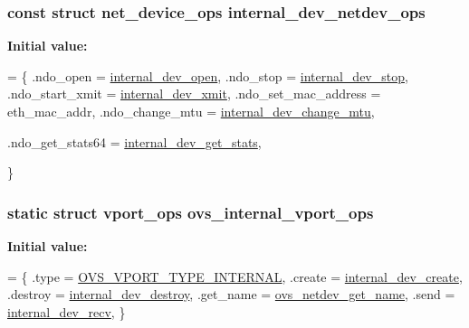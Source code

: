 \subsubsection[{internal\+\_\+dev\+\_\+netdev\+\_\+ops}]{\setlength{\rightskip}{0pt plus 5cm}const struct net\+\_\+device\+\_\+ops internal\+\_\+dev\+\_\+netdev\+\_\+ops\hspace{0.3cm}{\ttfamily [static]}}\label{vport-internal__dev_8c_af6e4b8260f029c8e987281b6e9890b8e}
{\bfseries Initial value\+:}
\begin{DoxyCode}
= \{
    .ndo\_open = \hyperlink{vport-internal__dev_8c_ad76be69f068e92dd73ee48d599a37ee3}{internal\_dev\_open},
    .ndo\_stop = \hyperlink{vport-internal__dev_8c_ac0b3dbdb4d6a02faeb1b94c46fe1ceb7}{internal\_dev\_stop},
    .ndo\_start\_xmit = \hyperlink{vport-internal__dev_8c_aafdf20e45216e64dfb927dbee0da1ec6}{internal\_dev\_xmit},
    .ndo\_set\_mac\_address = eth\_mac\_addr,
    .ndo\_change\_mtu = \hyperlink{vport-internal__dev_8c_a4a8e78d5216e9cff945747582c010613}{internal\_dev\_change\_mtu},

    .ndo\_get\_stats64 = \hyperlink{vport-internal__dev_8c_a1b51a40ab3a7e2ac5d45d0862de0eecd}{internal\_dev\_get\_stats},



\}
\end{DoxyCode}
\hypertarget{vport-internal__dev_8c_a20321257f6991e7ffb535947c382401e}{}
\subsubsection[{ovs\+\_\+internal\+\_\+vport\+\_\+ops}]{\setlength{\rightskip}{0pt plus 5cm}static struct {\bf vport\+\_\+ops} ovs\+\_\+internal\+\_\+vport\+\_\+ops\hspace{0.3cm}{\ttfamily [static]}}\label{vport-internal__dev_8c_a20321257f6991e7ffb535947c382401e}
{\bfseries Initial value\+:}
\begin{DoxyCode}
= \{
    .type       = \hyperlink{openvswitch_8h_a9a1b861aa99bd83177a2b10b34745b0aa99034286803fd0adf04dde0fa7e69f00}{OVS\_VPORT\_TYPE\_INTERNAL},
    .create     = \hyperlink{vport-internal__dev_8c_a08ffc4510ebd49d7ffdd031a112a18bb}{internal\_dev\_create},
    .destroy    = \hyperlink{vport-internal__dev_8c_ab75c92e096800c974c1d1590e797cd2d}{internal\_dev\_destroy},
    .get\_name   = \hyperlink{linux_2vport-netdev_8c_a63439e8a15ca15f649e7cd4c26a79437}{ovs\_netdev\_get\_name},
    .send       = \hyperlink{vport-internal__dev_8c_a259b00fb99d12379c06cf2b9d2de6050}{internal\_dev\_recv},
\}
\end{DoxyCode}

